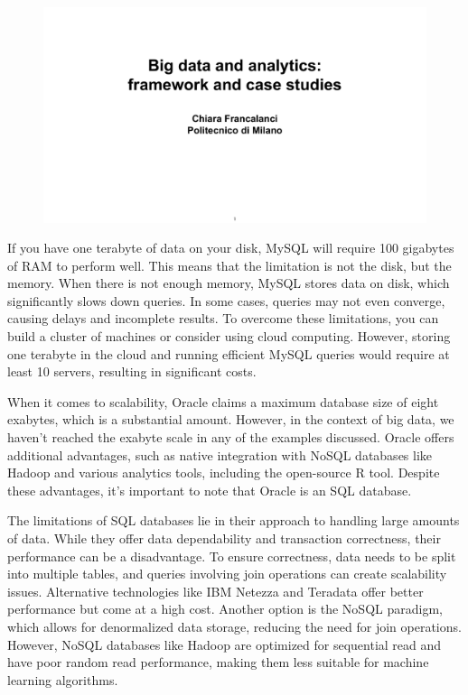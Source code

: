 \begin{figure}[!h]
  \centering
  \includegraphics[page=45, trim = 1.5cm 1.7cm 1cm 3.5cm, clip, width=\imagewidth]{images/06 - BIG_DATA.pdf}
\end{figure}

If you have one terabyte of data on your disk, MySQL will require 100
gigabytes of RAM to perform well. This means that the limitation is not
the disk, but the memory. When there is not enough memory, MySQL stores
data on disk, which significantly slows down queries. In some cases,
queries may not even converge, causing delays and incomplete results. To
overcome these limitations, you can build a cluster of machines or
consider using cloud computing. However, storing one terabyte in the
cloud and running efficient MySQL queries would require at least 10
servers, resulting in significant costs.

When it comes to scalability, Oracle claims a maximum database size of
eight exabytes, which is a substantial amount. However, in the context
of big data, we haven't reached the exabyte scale in any of the examples
discussed. Oracle offers additional advantages, such as native
integration with NoSQL databases like Hadoop and various analytics
tools, including the open-source R tool. Despite these advantages, it's
important to note that Oracle is an SQL database.

The limitations of SQL databases lie in their approach to handling large
amounts of data. While they offer data dependability and transaction
correctness, their performance can be a disadvantage. To ensure
correctness, data needs to be split into multiple tables, and queries
involving join operations can create scalability issues. Alternative
technologies like IBM Netezza and Teradata offer better performance but
come at a high cost. Another option is the NoSQL paradigm, which allows
for denormalized data storage, reducing the need for join operations.
However, NoSQL databases like Hadoop are optimized for sequential read
and have poor random read performance, making them less suitable for
machine learning algorithms.


